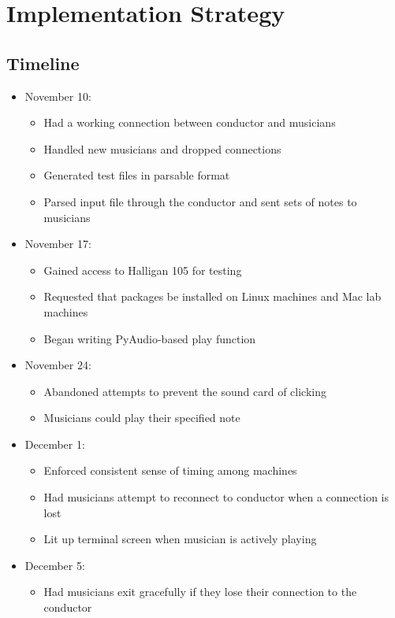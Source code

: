 \documentclass[12pt, letterpaper]{article}
\begin{document}
\section{Implementation Strategy}

\subsection{Timeline}
\begin{itemize}[parsep=0pt]
\item November 10:
    \begin{itemize}
    \item Had a working connection between conductor and musicians
    \item Handled new musicians and dropped connections
    \item Generated test files in parsable format
    \item Parsed input file through the conductor and sent sets of notes to musicians
    \end{itemize}
\item November 17:
    \begin{itemize}
    \item Gained access to Halligan 105 for testing
    \item Requested that packages be installed on Linux machines and Mac lab machines
    \item Began writing PyAudio-based play function
    \end{itemize}
\item November 24:
    \begin{itemize}
    \item Abandoned attempts to prevent the sound card of clicking
    \item Musicians could play their specified note
    \end{itemize}
\item December 1:
    \begin{itemize}
    \item Enforced consistent sense of timing among machines
    \item Had musicians attempt to reconnect to conductor when a connection is lost
    \item Lit up terminal screen when musician is actively playing
    \end{itemize}
\item December 5:
    \begin{itemize}
    \item Had musicians exit gracefully if they lose their connection to the conductor
    \end{itemize}
\end{itemize}
\end{document}
